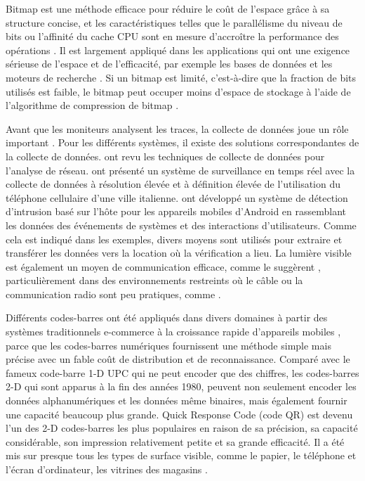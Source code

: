 Bitmap est une méthode efficace pour réduire le coût de l'espace grâce à sa structure concise, et les caractéristiques telles que le parallélisme du niveau de bits ou l'affinité du cache CPU sont en mesure d'accroître la performance des opérations \citep{culpepper2010efficient}. Il est largement appliqué dans les applications qui ont une exigence sérieuse de l'espace et de l'efficacité, par exemple les bases de données et les moteurs de recherche \citep{lemire2014}. Si un bitmap est limité, c'est-à-dire que la fraction de bits utilisés est faible, le bitmap peut occuper moins d'espace de stockage à l'aide de l'algorithme de compression de bitmap \citep{antoshenkov1995byte}.

Avant que les moniteurs analysent les traces, la collecte de données joue un rôle important \citep{casley1988collection}. Pour les différents systèmes, il existe des solutions correspondantes de la collecte de données. \cite{zwijze2005auditing} ont revu les techniques de collecte de données pour l'analyse de réseau. \cite{calabrese2011real} ont présenté un système de surveillance en temps réel avec la collecte de données à résolution élevée et à définition élevée de l'utilisation du téléphone cellulaire d'une ville italienne. \cite{shabtai2010applying} ont développé un système de détection d'intrusion basé sur l'hôte pour les appareils mobiles d'Android en rassemblant les données des événements de systèmes et des interactions d'utilisateurs. Comme cela est indiqué dans les exemples, divers moyens sont utilisés pour extraire et transférer les données vers la location où la vérification a lieu. La lumière visible est également un moyen de communication efficace, comme le suggèrent \cite{komine2004fundamental}, particulièrement dans des environnements restreints où le câble ou la communication radio sont peu pratiques, comme \cite{vasilescu2005data}.

Différents codes-barres ont été appliqués dans divers domaines à partir des systèmes traditionnels e-commerce à la croissance rapide d'appareils mobiles \citep{gao2007understanding}, parce que les codes-barres numériques fournissent une méthode simple mais précise avec un fable coût de distribution et de reconnaissance. Comparé avec le fameux code-barre 1-D UPC qui ne peut encoder que des chiffres, les codes-barres 2-D qui sont apparus à la fin des années 1980, peuvent non seulement encoder les données alphanumériques et les données même binaires, mais également fournir une capacité beaucoup plus grande. Quick Response Code (code QR) \citep{qrcode-about} est devenu l'un des 2-D codes-barres les plus populaires en raison de sa précision, sa capacité considérable, son impression relativement petite et sa grande efficacité. Il a été mis sur presque tous les types de surface visible, comme le papier, le téléphone et l'écran d'ordinateur, les vitrines des magasins \citep{okazaki2012benchmarking}.


